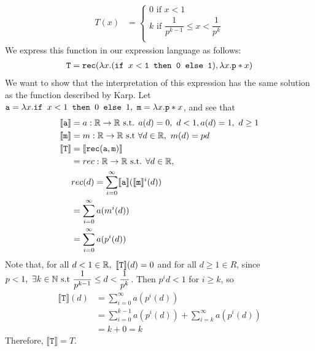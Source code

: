 \begin{align*}
T(x) &= 
 \begin{cases}
 0 \text{ if } x < 1 \\
 k \text{ if }  \dfrac{1}{p^{k-1}} \leq x < \dfrac{1}{p^k} \\
 \end{cases}
 \end{align*}
 We express this function in our expression language as follows: 
 \begin{align*}
 \texttt{T} = \texttt{rec}(\lambda x.(\texttt{if } x<\texttt{1} \texttt{ then } \texttt{0} \texttt{ else } \texttt{1}), \lambda x. \texttt{p}*x)
 \end{align*}
 We want to show that the interpretation of this expression has the same solution as the function described by Karp.
 Let $\texttt{a} = \lambda x.\texttt{if } x<1 \texttt{ then } 0 \texttt{ else } 1, \ \texttt{m} = \lambda x.\texttt{p}*x$, and see that
 \begin{align*}
  \llbracket \texttt{a} \rrbracket &= a : \mathbb{R} \rightarrow \mathbb{R} \text{ s.t. } a(d) = 0, 
  \ d<1, a(d) = 1, \ d \geq 1  \\
 \llbracket \texttt{m} \rrbracket &= m : \mathbb{R} \rightarrow \mathbb{R} \text{ s.t } \forall d \in \mathbb{R}, \
 m(d) = pd \\
 \llbracket \texttt{T} \rrbracket&= \llbracket \texttt{rec}(\texttt{a}, \texttt{m}) \rrbracket \\
 &= rec: \mathbb{R} \rightarrow \mathbb{R} \text{ s.t. } \forall d \in \mathbb{R}, \\
 &rec(d) = \sum_{i=0}^{\infty}\llbracket \texttt{a} \rrbracket (\llbracket \texttt{m} \rrbracket^i(d)) \\
 &= \sum_{i=0}^{\infty}a (m^i(d)) \\
 &= \sum_{i=0}^{\infty}a (p^i(d))
 \end{align*}
Note that, for all $ d<1 \in \mathbb{R}, \ \llbracket \texttt{T} \rrbracket(d) = 0$
and for all $d \geq 1 \in R$, since $p < 1, \ \exists k \in \mathbb{N} \text{ s.t } \dfrac{1}{p^{k-1}} \leq d < \dfrac{1}{p^k}$. Then
$p^id < 1$ for $i \geq k$, so
\begin{align*}
\llbracket \texttt{T} \rrbracket(d)&= \sum_{i=0}^{\infty}a (p^i(d)) \\
&= \sum_{i=0}^{k-1}a (p^i(d)) + \sum_{i=k}^{\infty}a (p^i(d)) \\
&= k + 0 = k
\end{align*}
Therefore, $\llbracket \texttt{T} \rrbracket = T$.
 

